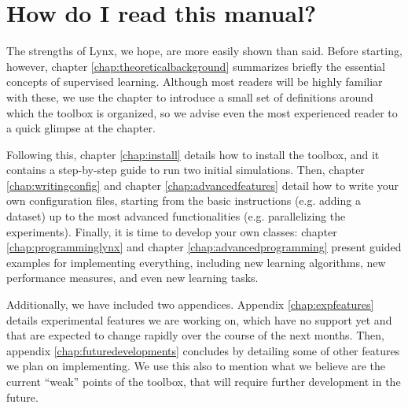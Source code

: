 \section*{How do I read this manual?}

The strengths of Lynx, we hope, are more easily shown than said. Before starting, however, chapter \ref{chap:theoreticalbackground} summarizes briefly the essential concepts of supervised learning. Although most readers will be highly familiar with these, we use the chapter to introduce a small set of definitions around which the toolbox is organized, so we advise even the most experienced reader to a quick glimpse at the chapter.

Following this, chapter \ref{chap:install} details how to install the toolbox, and it contains a step-by-step guide to run two initial simulations. Then, chapter \ref{chap:writingconfig} and chapter \ref{chap:advancedfeatures} detail how to write your own configuration files, starting from the basic instructions (e.g. adding a dataset) up to the most advanced functionalities (e.g. parallelizing the experiments). Finally, it is time to develop your own classes: chapter \ref{chap:programminglynx} and chapter \ref{chap:advancedprogramming} present guided examples for implementing everything, including new learning algorithms, new performance measures, and even new learning tasks.

Additionally, we have included two appendices. Appendix \ref{chap:expfeatures} details experimental features we are working on, which have no support yet and that are expected to change rapidly over the course of the next months. Then, appendix \ref{chap:futuredevelopments} concludes by detailing some of other features we plan on implementing. We use this also to mention what we believe are the current ``weak'' points of the toolbox, that will require further development in the future.
